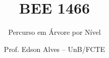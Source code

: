 \title{BEE 1466}
\subtitle{Percurso em Árvore por Nível}
\author{Prof. Edson Alves -- UnB/FCTE}
\date{}
